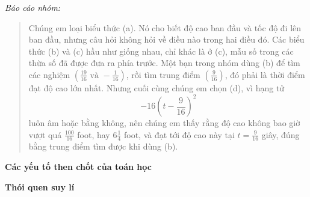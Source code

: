 {    \emph{Báo cáo nhóm:}

    \begin{quote}
      Chúng em loại biểu thức (a). Nó cho biết độ cao ban đầu và tốc độ đi lên ban đầu, nhưng câu hỏi không hỏi về điều nào trong hai điều đó. Các biểu thức (b) và (c) hầu như giống nhau, chỉ khác là ở (c), mẫu số trong các thừa số đã được đưa ra phía trước. Một bạn trong nhóm dùng (b) để tìm các nghiệm $\left(\frac{19}{16} \text{ và } -\frac{1}{16}\right)$, rồi tìm trung điểm $\left(\frac{9}{16}\right)$, đó phải là thời điểm đạt độ cao lớn nhất. Nhưng cuối cùng chúng em chọn (d), vì hạng tử
      $$
        -16\left(t-\frac{9}{16}\right)^2
      $$
      luôn âm hoặc bằng không, nên chúng em thấy rằng độ cao không bao giờ vượt quá $\frac{100}{16}$ foot, hay $6\frac{1}{4}$ foot, và đạt tới độ cao này tại $t=\frac{9}{16}$ giây, đúng bằng trung điểm tìm được khi dùng (b).
    \end{quote}

    \textbf{Các yếu tố then chốt của toán học}

    \begin{hanglist}
      \vspace{\baselineskip}
    \end{hanglist}

    \textbf{Thói quen suy lí}

    \begin{hanglist}
      \vspace{\baselineskip}

    \end{hanglist}
  }{}

